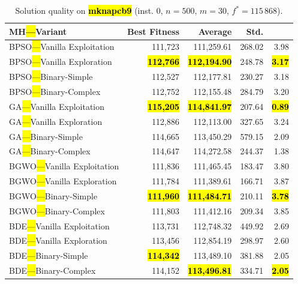 \documentclass[mathematics,article,accept,moreauthors]{Definitions/mdpi}
\begin{document}
\vspace{-9pt}


\begin{table}[H]
  \small
  \caption{Solution quality on \textbf{\hl{mknapcb9}} (inst. 0, $n=500$, $m=30$, $f^*=115\,868$).}
  \label{tab:calidad_mknapcb9_0}
  \begin{tabularx}{\textwidth}{lRRRR}
    \toprule
    \textbf{MH\hl{---}Variant} &
    \textbf{Best Fitness} &
    \textbf{Average} &
    \textbf{Std.} &
    \textbf{} \\
    \midrule
    BPSO\hl{---}Vanilla Exploitation &         111,723 &        111,259.61 & 268.02 &         3.98 \\
    BPSO\hl{---}Vanilla Exploration  & \textbf{\hl{112,766}} & \textbf{\hl{112,194.90}} & 248.78 & \textbf{\hl{3.17}} \\
    BPSO\hl{---}Binary-Simple        &         112,527 &        112,177.81 & 230.27 &         3.18 \\
    BPSO\hl{---}Binary-Complex       &         112,752 &        112,155.48 & 284.79 &         3.20 \\
    \midrule
    GA\hl{---}Vanilla Exploitation   & \textbf{\hl{115,205}} & \textbf{\hl{114,841.97}} & 207.64 & \textbf{\hl{0.89}} \\
    GA\hl{---}Vanilla Exploration    &         112,886 &        112,113.00 & 327.65 &         3.24 \\
    GA\hl{---}Binary-Simple          &         114,665 &        113,450.29 & 579.15 &         2.09 \\
    GA\hl{---}Binary-Complex         &         114,647 &        114,272.58 & 244.37 &         1.38 \\
    \midrule
    BGWO\hl{---}Vanilla Exploitation &         111,836 &        111,465.45 & 183.47 &         3.80 \\
    BGWO\hl{---}Vanilla Exploration  &         111,784 &        111,389.61 & 166.71 &         3.87 \\
    BGWO\hl{---}Binary-Simple        & \textbf{\hl{111,960}} & \textbf{\hl{111,484.71}} & 210.11 & \textbf{\hl{3.78}} \\
    BGWO\hl{---}Binary-Complex       &         111,803 &        111,412.16 & 209.34 &         3.85 \\
    \midrule
    BDE\hl{---}Vanilla Exploitation  &         113,731 &        112,748.32 & 449.92 &         2.69 \\
    BDE\hl{---}Vanilla Exploration   &         113,456 &        112,854.19 & 298.97 &         2.60 \\
    BDE\hl{---}Binary-Simple         & \textbf{\hl{114,342}} &        113,489.10 & 381.88 &         2.05 \\
    BDE\hl{---}Binary-Complex        &         114,152 & \textbf{\hl{113,496.81}} & 334.71 & \textbf{\hl{2.05}} \\
    \bottomrule
  \end{tabularx}
\end{table}
\end{document}
